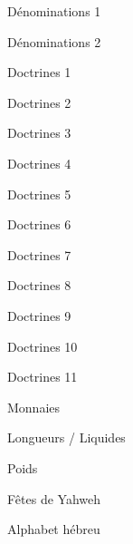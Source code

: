 \documentclass[11pt]{book}
\begin{document}
\begin{center}Dénominations 1\end{center}\clearpage
\begin{center}Dénominations 2\end{center}\clearpage
{}\clearpage
\begin{center}Doctrines 1\end{center}\clearpage
\begin{center}Doctrines 2\end{center}\clearpage
\begin{center}Doctrines 3\end{center}\clearpage
\begin{center}Doctrines 4\end{center}\clearpage
\begin{center}Doctrines 5\end{center}\clearpage
\begin{center}Doctrines 6\end{center}\clearpage
\begin{center}Doctrines 7\end{center}\clearpage
\begin{center}Doctrines 8\end{center}\clearpage
\begin{center}Doctrines 9\end{center}\clearpage
\begin{center}Doctrines 10\end{center}\clearpage
\begin{center}Doctrines 11\end{center}\clearpage
{}\clearpage
\begin{center}Monnaies\end{center}\clearpage
{}\clearpage
\begin{center}Longueurs / Liquides\end{center}\clearpage
{}\clearpage
\begin{center}Poids\end{center}\clearpage
{}\clearpage
\begin{center}Fêtes de Yahweh\end{center}\clearpage
{}\clearpage
\begin{center}Alphabet hébreu\end{center}\clearpage
\end{document}
